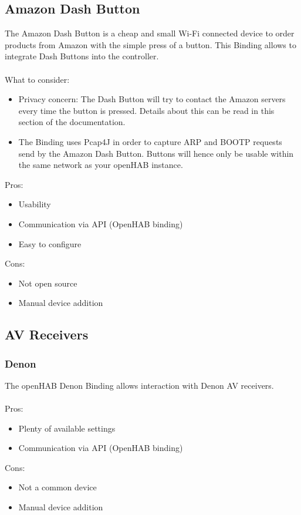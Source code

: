 \subsection{Amazon Dash Button}
The Amazon Dash Button is a cheap and small Wi-Fi connected device to order products from Amazon with the simple press of
a button. This Binding allows to integrate Dash Buttons into the controller.\\~\\
What to consider:
\begin{itemize}
	\item Privacy concern: The Dash Button will try to contact the Amazon servers every time the button is pressed. Details about
	this can be read in this section of the documentation.
	\item The Binding uses Pcap4J in order to capture ARP and BOOTP requests send by the Amazon Dash Button. Buttons will
	hence only be usable within the same network as your openHAB instance.
\end{itemize}
Pros:
\begin{itemize}
	\item Usability
	\item Communication via API (OpenHAB binding)
	\item Easy to configure
\end{itemize}
Cons:
\begin{itemize}
	\item Not open source
	\item Manual device addition
\end{itemize}

\subsection{AV Receivers}

\subsubsection{Denon}
The openHAB Denon Binding allows interaction with Denon AV receivers.\\~\\
Pros:
\begin{itemize}
	\item Plenty of available settings
	\item Communication via API (OpenHAB binding)
\end{itemize}
Cons:
\begin{itemize}
	\item Not a common device
	\item Manual device addition
\end{itemize}

